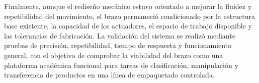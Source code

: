 Finalmente, aunque el rediseño mecánico estuvo orientado a mejorar la fluidez y repetibilidad del movimiento, el brazo permaneció condicionado por la estructura base existente, la capacidad de los actuadores, el espacio de trabajo disponible y las tolerancias de fabricación. La validación del sistema se realizó mediante pruebas de precisión, repetibilidad, tiempo de respuesta y funcionamiento general, con el objetivo de comprobar la viabilidad del brazo como una plataforma académica funcional para tareas de clasificación, manipulación y transferencia de productos en una línea de empaquetado controlada.